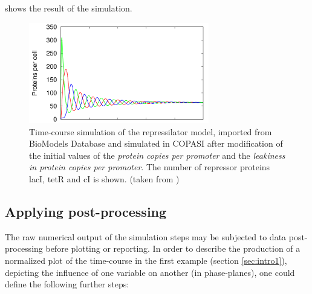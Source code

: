  shows the result of the simulation.
%
\begin{figure}
\centering
\includegraphics[width=0.7\textwidth]{images/simEx3.png}
\caption{Time-course simulation of the repressilator model, imported from BioModels Database and simulated in COPASI after modification of the initial values of the \emph{protein copies per promoter} and the \emph{leakiness in protein copies per promoter}. The number of repressor proteins lacI, tetR and cI is shown. (taken from \cite{Waltemath:2011})}
\label{fig:simEx3}
\end{figure}


\subsection{Applying post-processing}
The raw numerical output of the simulation steps may be subjected to data post-processing before plotting or reporting.  In order to describe the production of a normalized plot of the time-course in the first example (section \ref{sec:intro1}), depicting the influence of one variable on another (in phase-planes), one could define the following further steps:

